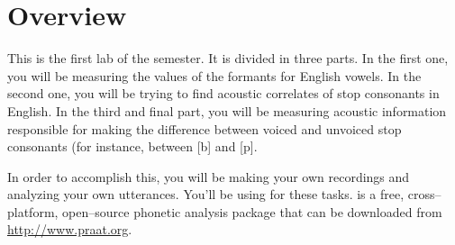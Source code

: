 \section{Overview}

This is the first lab of the semester. It is divided in three parts. In the first one, you will be measuring the values of the formants for English vowels. In the second one, you will be trying to find acoustic correlates of stop consonants in English. In the third and final part, you will be measuring acoustic information responsible for making the difference between voiced and unvoiced stop consonants (for instance, between [b] and [p].

In order to accomplish this, you will be making your own recordings and analyzing your own utterances. You'll be using \Praat{} for these tasks. \Praat{} is a free, cross--platform, open--source phonetic analysis package that can be downloaded from \href{http://www.praat.org}{http://www.praat.org}.

